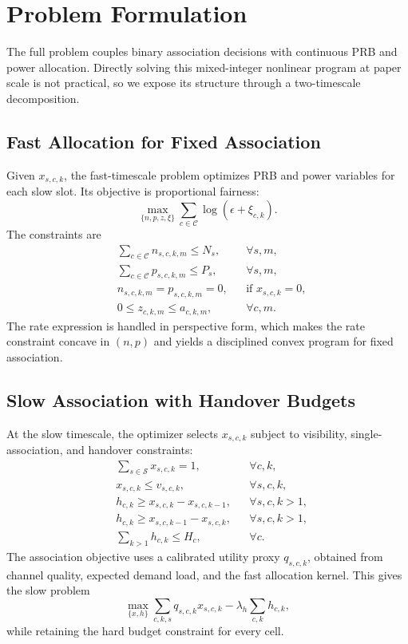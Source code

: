 
\section{Problem Formulation}

The full problem couples binary association decisions with continuous PRB and
power allocation. Directly solving this mixed-integer nonlinear program at paper
scale is not practical, so we expose its structure through a two-timescale
decomposition.

\subsection{Fast Allocation for Fixed Association}

Given $x_{s,c,k}$, the fast-timescale problem optimizes PRB and power variables
for each slow slot. Its objective is proportional fairness:
\begin{equation}
    \max_{\{n,p,z,\xi\}}
    \sum_{c \in \mathcal{C}} \log(\epsilon + \xi_{c,k}).
\end{equation}
The constraints are
\begin{align}
    &\sum_{c \in \mathcal{C}} n_{s,c,k,m} \leq N_s,
    &&\forall s,m,\\
    &\sum_{c \in \mathcal{C}} p_{s,c,k,m} \leq P_s,
    &&\forall s,m,\\
    &n_{s,c,k,m}=p_{s,c,k,m}=0,
    &&\text{if } x_{s,c,k}=0,\\
    &0 \leq z_{c,k,m} \leq a_{c,k,m},
    &&\forall c,m.
\end{align}
The rate expression is handled in perspective form, which makes the rate
constraint concave in $(n,p)$ and yields a disciplined convex program for fixed
association.

\subsection{Slow Association with Handover Budgets}

At the slow timescale, the optimizer selects $x_{s,c,k}$ subject to visibility,
single-association, and handover constraints:
\begin{align}
    &\sum_{s \in \mathcal{S}} x_{s,c,k}=1,
    &&\forall c,k,\\
    &x_{s,c,k}\leq v_{s,c,k},
    &&\forall s,c,k,\\
    &h_{c,k}\geq x_{s,c,k}-x_{s,c,k-1},
    &&\forall s,c,k>1,\\
    &h_{c,k}\geq x_{s,c,k-1}-x_{s,c,k},
    &&\forall s,c,k>1,\\
    &\sum_{k>1} h_{c,k}\leq H_c,
    &&\forall c.
\end{align}
The association objective uses a calibrated utility proxy
$q_{s,c,k}$, obtained from channel quality, expected demand load, and the fast
allocation kernel. This gives the slow problem
\begin{equation}
    \max_{\{x,h\}}
    \sum_{c,k,s} q_{s,c,k} x_{s,c,k}
    - \lambda_h \sum_{c,k} h_{c,k},
\end{equation}
while retaining the hard budget constraint for every cell.
